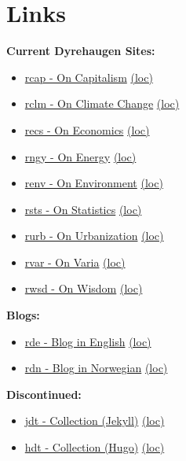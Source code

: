 \documentclass[
]{book}
\providecommand{\tightlist}{%
  \setlength{\itemsep}{0pt}\setlength{\parskip}{0pt}}
\begin{document}
\hypertarget{links}{%
\chapter{Links}\label{links}}

\textbf{Current Dyrehaugen Sites:}

\begin{itemize}
\tightlist
\item
  \href{https://dyrehaugen.github.io/rcap}{rcap - On Capitalism} \href{http://localhost/rcap}{(loc)}
\item
  \href{https://dyrehaugen.github.io/rclm}{rclm - On Climate Change} \href{http://localhost/rclm}{(loc)}
\item
  \href{https://dyrehaugen.github.io/recs}{recs - On Economics} \href{http://localhost/recs}{(loc)}
\item
  \href{https://dyrehaugen.github.io/rngy}{rngy - On Energy} \href{http://localhost/rngy}{(loc)}
\item
  \href{https://dyrehaugen.github.io/renv}{renv - On Environment} \href{http://localhost/renv}{(loc)}
\item
  \href{https://dyrehaugen.github.io/rsts}{rsts - On Statistics} \href{http://localhost/rsts}{(loc)}
\item
  \href{https://dyrehaugen.github.io/rurb}{rurb - On Urbanization} \href{http://localhost/rurb}{(loc)}
\item
  \href{https://dyrehaugen.github.io/rvar}{rvar - On Varia} \href{http://localhost/rvar}{(loc)}
\item
  \href{https://dyrehaugen.github.io/rwsd}{rwsd - On Wisdom} \href{http://localhost/rwsd}{(loc)}
\end{itemize}

\textbf{Blogs:}

\begin{itemize}
\tightlist
\item
  \href{https://dyrehaugen.github.io/rde}{rde - Blog in English} \href{http://localhost/rde}{(loc)}
\item
  \href{https://dyrehaugen.github.io/rdn}{rdn - Blog in Norwegian} \href{http://localhost/rdn}{(loc)}
\end{itemize}

\textbf{Discontinued:}

\begin{itemize}
\tightlist
\item
  \href{https://dyrehaugen.github.io/jdt}{jdt - Collection (Jekyll)} \href{http://localhost/jdt}{(loc)}
\item
  \href{https://dyrehaugen.github.io/hdt}{hdt - Collection (Hugo)} \href{http://localhost/hdt}{(loc)}
\end{itemize}
\end{document}
